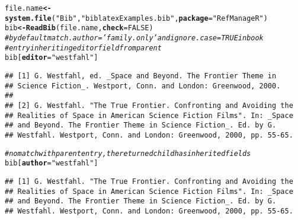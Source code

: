 \documentclass[article]{jss}\usepackage[]{graphicx}\usepackage[]{color}
\makeatletter
\newcommand{\hlnum}[1]{\textcolor[rgb]{0.125,0.125,1}{#1}}%
\newcommand{\hlstr}[1]{\textcolor[rgb]{0.125,0.125,1}{#1}}%
\newcommand{\hlcom}[1]{\textcolor[rgb]{1,0,0.753}{\textit{#1}}}%
\newcommand{\hlstd}[1]{\textcolor[rgb]{0.251,0.251,0.282}{#1}}%
\newcommand{\hlkwb}[1]{\textcolor[rgb]{0.439,0.251,1}{\textbf{#1}}}%
\newcommand{\hlkwc}[1]{\textcolor[rgb]{0.529,0,0.184}{\textbf{#1}}}%
\newcommand{\hlkwd}[1]{\textcolor[rgb]{0.251,0.251,0.282}{\textbf{#1}}}%
\newenvironment{kframe}{%
 \def\at@end@of@kframe{}%
 \ifinner\ifhmode%
  \def\at@end@of@kframe{\end{minipage}}%
  \begin{minipage}{\columnwidth}%
 \fi\fi%
 \def\FrameCommand##1{\hskip\@totalleftmargin \hskip-\fboxsep
 \colorbox{shadecolor}{##1}\hskip-\fboxsep
     \hskip-\linewidth \hskip-\@totalleftmargin \hskip\columnwidth}%
 \MakeFramed {\advance\hsize-\width
   \@totalleftmargin\z@ \linewidth\hsize
   \@setminipage}}%
 {\par\unskip\endMakeFramed%
 \at@end@of@kframe}
\newenvironment{knitrout}{}{} %
\makeatother
\begin{document}
\begin{knitrout}
\color{fgcolor}\begin{kframe}
\begin{alltt}
\hlstd{file.name} \hlkwb{<-} \hlkwd{system.file}\hlstd{(}\hlstr{"Bib"}\hlstd{,} \hlstr{"biblatexExamples.bib"}\hlstd{,} \hlkwc{package} \hlstd{=} \hlstr{"RefManageR"}\hlstd{)}
\hlstd{bib} \hlkwb{<-} \hlkwd{ReadBib}\hlstd{(file.name,} \hlkwc{check} \hlstd{=} \hlnum{FALSE}\hlstd{)}
\hlcom{# by default match.author = 'family.only' and ignore.case = TRUE inbook}
\hlcom{# entry inheriting editor field from parent}
\hlstd{bib[}\hlkwc{editor} \hlstd{=} \hlstr{"westfahl"}\hlstd{]}
\end{alltt}
\begin{verbatim}
## [1] G. Westfahl, ed. _Space and Beyond. The Frontier Theme in
## Science Fiction_. Westport, Conn. and London: Greenwood, 2000.
## 
## [2] G. Westfahl. "The True Frontier. Confronting and Avoiding the
## Realities of Space in American Science Fiction Films". In: _Space
## and Beyond. The Frontier Theme in Science Fiction_. Ed. by G.
## Westfahl. Westport, Conn. and London: Greenwood, 2000, pp. 55-65.
\end{verbatim}
\begin{alltt}
\hlcom{# no match with parent entry, the returned child has inherited fields}
\hlstd{bib[}\hlkwc{author} \hlstd{=} \hlstr{"westfahl"}\hlstd{]}
\end{alltt}
\begin{verbatim}
## [1] G. Westfahl. "The True Frontier. Confronting and Avoiding the
## Realities of Space in American Science Fiction Films". In: _Space
## and Beyond. The Frontier Theme in Science Fiction_. Ed. by G.
## Westfahl. Westport, Conn. and London: Greenwood, 2000, pp. 55-65.
\end{verbatim}
\end{kframe}
\end{knitrout}
\end{document}
